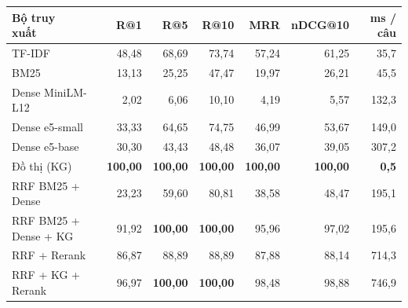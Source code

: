 \begin{tabular}{lrrrrrr}
\toprule
\makecell[l]{Bộ truy\\xuất} & R@1 & R@5 & R@10 & MRR & nDCG@10 & ms / câu \\
\midrule
TF-IDF & 48{,}48 & 68{,}69 & 73{,}74 & 57{,}24 & 61{,}25 & 35{,}7 \\
BM25 & 13{,}13 & 25{,}25 & 47{,}47 & 19{,}97 & 26{,}21 & 45{,}5 \\
Dense MiniLM-L12 & 2{,}02 & 6{,}06 & 10{,}10 & 4{,}19 & 5{,}57 & 132{,}3 \\
Dense e5-small & 33{,}33 & 64{,}65 & 74{,}75 & 46{,}99 & 53{,}67 & 149{,}0 \\
Dense e5-base & 30{,}30 & 43{,}43 & 48{,}48 & 36{,}07 & 39{,}05 & 307{,}2 \\
Đồ thị (KG) & \textbf{100{,}00} & \textbf{100{,}00} & \textbf{100{,}00} & \textbf{100{,}00} & \textbf{100{,}00} & \textbf{0{,}5} \\
RRF BM25 + Dense & 23{,}23 & 59{,}60 & 80{,}81 & 38{,}58 & 48{,}47 & 195{,}1 \\
RRF BM25 + Dense + KG & 91{,}92 & \textbf{100{,}00} & \textbf{100{,}00} & 95{,}96 & 97{,}02 & 195{,}6 \\
RRF + Rerank & 86{,}87 & 88{,}89 & 88{,}89 & 87{,}88 & 88{,}14 & 714{,}3 \\
RRF + KG + Rerank & 96{,}97 & \textbf{100{,}00} & \textbf{100{,}00} & 98{,}48 & 98{,}88 & 746{,}9 \\
\bottomrule
\end{tabular}
